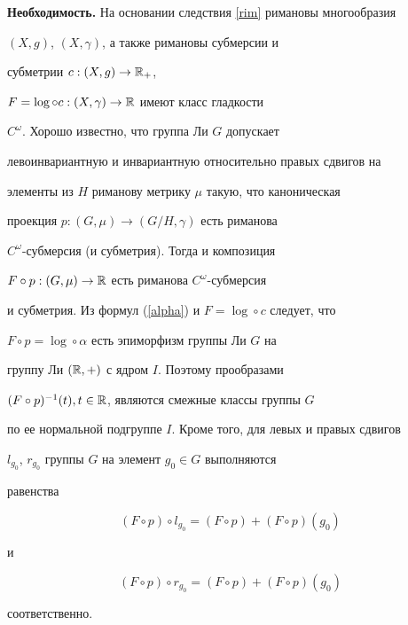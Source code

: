 \begin{pf}


{\bf Необходимость.} На основании следствия \ref{rim} римановы многообразия


$(X,g)$, $(X,\gamma)$, а также римановы субмерсии и


субметрии $c:(X,g)\rightarrow \Bbb{R}_{+}$,


$F=\log\circ{c}: (X,\gamma)\rightarrow \Bbb{R}$ имеют класс гладкости


$C^{\omega}$. Хорошо известно, что группа Ли $G$ допускает


левоинвариантную и инвариантную относительно правых сдвигов на


элементы из $H$ риманову метрику $\mu$ такую, что каноническая


проекция $p: (G,\mu)\rightarrow (G/H,\gamma)$ есть риманова


$C^{\omega}$-субмерсия (и субметрия). Тогда и композиция


$F\circ{p}:(G,\mu)\rightarrow \Bbb{R}$ есть риманова $C^{\omega}$-субмерсия


и субметрия. Из формул (\ref{alpha}) и $F=\log\circ{c}$ следует, что


$F\circ{p}=\log\circ{\alpha}$ есть эпиморфизм группы Ли $G$ на


группу Ли $(\Bbb{R},+)$ с ядром $I$. Поэтому прообразами


$(F\circ{p})^{-1}(t), t\in \Bbb{R}$, являются смежные классы группы $G$


по ее нормальной подгруппе $I$. Кроме того, для левых и правых сдвигов


$l_{g_{0}}$, $r_{g_{0}}$ группы $G$ на элемент $g_{0}\in G$ выполняются


равенства


\begin{equation}


\label{grad}


(F\circ{p})\circ{l_{g_{0}}}=(F\circ{p})+(F\circ{p})(g_{0})


\end{equation}


и


\begin{equation}


\label{gradr}


(F\circ{p})\circ{r_{g_{0}}}=(F\circ{p})+(F\circ{p})(g_{0})


\end{equation}


соответственно.



\end{pf}
